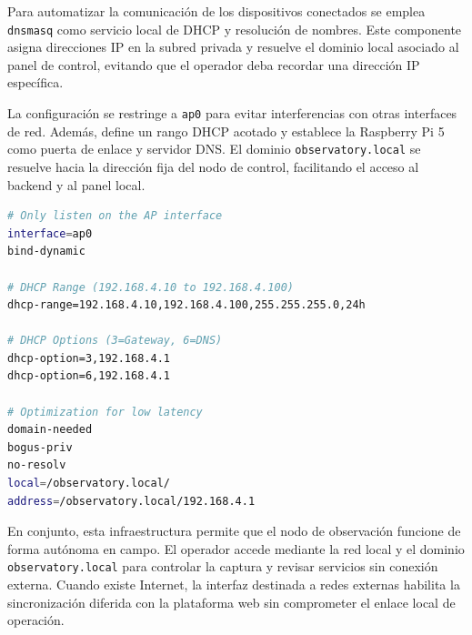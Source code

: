 Para automatizar la comunicación de los dispositivos conectados se emplea
\texttt{dnsmasq} como servicio local de DHCP y resolución de nombres. Este
componente asigna direcciones IP en la subred privada y resuelve el dominio local
asociado al panel de control, evitando que el operador deba recordar una dirección
IP específica.

La configuración se restringe a \texttt{ap0} para evitar interferencias con otras
interfaces de red. Además, define un rango DHCP acotado y establece la Raspberry
Pi 5 como puerta de enlace y servidor DNS. El dominio \texttt{observatory.local}
se resuelve hacia la dirección fija del nodo de control, facilitando el acceso al
backend y al panel local.

\begin{lstlisting}[language=bash,basicstyle=\footnotesize\ttfamily,breaklines=true,caption={Configuración de dnsmasq para asignación DHCP y resolución local.},label={lst:dnsmasq-ap0}]
# Only listen on the AP interface
interface=ap0
bind-dynamic

# DHCP Range (192.168.4.10 to 192.168.4.100)
dhcp-range=192.168.4.10,192.168.4.100,255.255.255.0,24h

# DHCP Options (3=Gateway, 6=DNS)
dhcp-option=3,192.168.4.1
dhcp-option=6,192.168.4.1

# Optimization for low latency
domain-needed
bogus-priv
no-resolv
local=/observatory.local/
address=/observatory.local/192.168.4.1
\end{lstlisting}

En conjunto, esta infraestructura permite que el nodo de observación funcione de
forma autónoma en campo. El operador accede mediante la red local y el dominio
\texttt{observatory.local} para controlar la captura y revisar servicios sin
conexión externa. Cuando existe Internet, la interfaz destinada a redes externas
habilita la sincronización diferida con la plataforma web sin comprometer el
enlace local de operación.